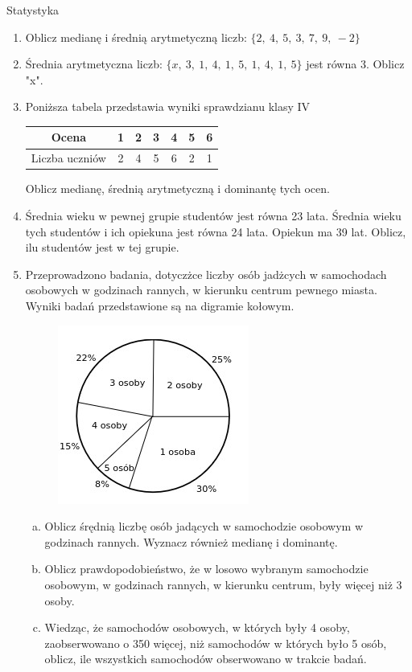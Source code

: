 \documentclass[12pt,a4paper]{article}
\begin{document}
	\begin{center}
	\LARGE Statystyka
\end{center}
\vspace{1cm}
\begin{enumerate}[1.]
	\item Oblicz medianę i średnią arytmetyczną liczb: $\{2,\:4,\:5,\:3,\:7,\:9,\:-2\}$
	\item Średnia arytmetyczna liczb: $\{x,\:3,\:1,\:4,\:1,\:5,\:1,\:4,\:1,\:5\}$ jest równa 3. Oblicz "x".
	\item Poniższa tabela przedstawia wyniki sprawdzianu klasy IV
	
	\begin{tabular}{|c|c|c|c|c|c|c|}
		\hline
		Ocena&1&2&3&4&5&6\\
		\hline
		Liczba uczniów&2&4&5&6&2&1\\
		\hline
	\end{tabular}

Oblicz medianę, średnią arytmetyczną i dominantę tych ocen.

\item Średnia wieku w pewnej grupie studentów jest równa 23 lata. Średnia wieku tych studentów i ich opiekuna jest równa 24 lata. Opiekun ma 39 lat. Oblicz, ilu studentów jest w tej grupie.

\item Przeprowadzono badania, dotyczżce liczby osób jadżcych w samochodach osobowych w godzinach rannych, w kierunku centrum pewnego miasta. Wyniki badań przedstawione są na digramie kołowym.

\begin{figure}[h]
	\centering
	\includegraphics{stat1.jpeg}
\end{figure}
\begin{enumerate}[a)]
	\item Oblicz śrędnią liczbę osób jadących w samochodzie osobowym w godzinach rannych. Wyznacz również medianę i dominantę.
	\item Oblicz prawdopodobieństwo, że w losowo wybranym samochodzie osobowym, w godzinach
	rannych, w kierunku centrum, były więcej niż 3 osoby.
	\item Wiedząc, że samochodów osobowych, w których były 4 osoby, zaobserwowano o 350 więcej,	niż samochodów w których było 5 osób, oblicz, ile wszystkich samochodów obserwowano w
	trakcie badań.
\end{enumerate}
\end{enumerate}
\end{document}
